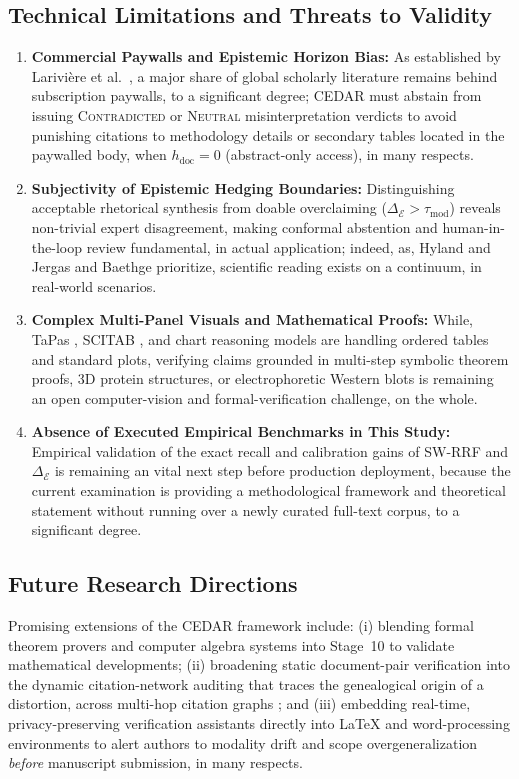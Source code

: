 \documentclass[journal]{IEEEtran}
\begin{document}
\subsection{Technical Limitations and Threats to Validity}
\begin{enumerate}
\item \textbf{Commercial Paywalls and Epistemic Horizon Bias:} As established by Larivi{\`e}re et al.\ \cite{lariviere2015oligopoly}, a major share of global scholarly literature remains behind subscription paywalls, to a significant degree; CEDAR must abstain from issuing \textsc{Contradicted} or \textsc{Neutral} misinterpretation verdicts to avoid punishing citations to methodology details or secondary tables located in the paywalled body, when $h_{\text{doc}} = 0$ (abstract-only access), in many respects.
\item \textbf{Subjectivity of Epistemic Hedging Boundaries:} Distinguishing acceptable rhetorical synthesis from doable overclaiming ($\Delta_{\mathcal{E}} > \tau_{\text{mod}}$) reveals non-trivial expert disagreement, making conformal abstention and human-in-the-loop review fundamental, in actual application; indeed, as, Hyland \cite{hyland1998hedging} and Jergas and Baethge \cite{jergas2015quotation} prioritize, scientific reading exists on a continuum, in real-world scenarios.
\item \textbf{Complex Multi-Panel Visuals and Mathematical Proofs:} While, TaPas \cite{herzig2020tapas}, SCITAB \cite{lu2023scitab}, and chart reasoning models \cite{akhtar2023reading} are handling ordered tables and standard plots, verifying claims grounded in multi-step symbolic theorem proofs, 3D protein structures, or electrophoretic Western blots is remaining an open computer-vision and formal-verification challenge, on the whole.
\item \textbf{Absence of Executed Empirical Benchmarks in This Study:} Empirical validation of the exact recall and calibration gains of SW-RRF and $\Delta_{\mathcal{E}}$ is remaining an vital next step before production deployment, because the current examination is providing a methodological framework and theoretical statement without running over a newly curated full-text corpus, to a significant degree.
\end{enumerate}

\subsection{Future Research Directions}
Promising extensions of the CEDAR framework include: (i) blending formal theorem provers and computer algebra systems into Stage~10 to validate mathematical developments; (ii) broadening static document-pair verification into the dynamic citation-network auditing that traces the genealogical origin of a distortion, across multi-hop citation graphs \cite{greenberg2009citation,simkin2003read}; and (iii) embedding real-time, privacy-preserving verification assistants directly into LaTeX and word-processing environments to alert authors to modality drift and scope overgeneralization \emph{before} manuscript submission, in many respects.
\end{document}
